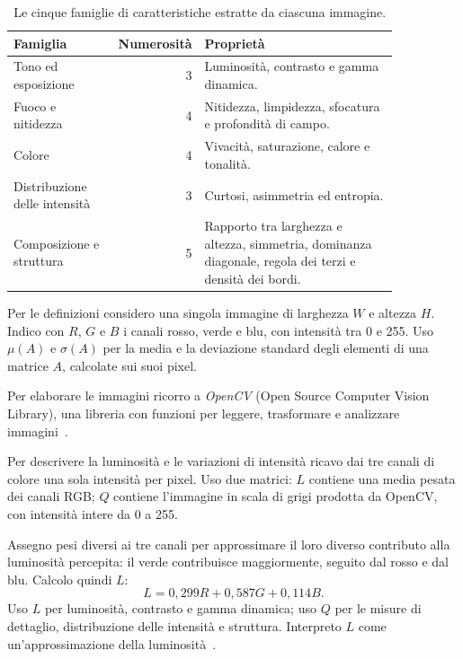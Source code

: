 \begin{table}[htbp]
    \centering
    \small
    \caption{Le cinque famiglie di caratteristiche estratte da ciascuna immagine.}
    \label{tab:feature-famiglie}
    \begin{tabular}{@{}p{0.28\linewidth}rp{0.57\linewidth}@{}}
        \toprule
        Famiglia & Numerosità & Proprietà \\
        \midrule
        Tono ed esposizione & 3 & Luminosità, contrasto e gamma dinamica. \\
        Fuoco e nitidezza & 4 & Nitidezza, limpidezza, sfocatura e profondità di campo. \\
        Colore & 4 & Vivacità, saturazione, calore e tonalità. \\
        Distribuzione delle intensità & 3 & Curtosi, asimmetria ed entropia. \\
        Composizione e struttura & 5 & Rapporto tra larghezza e altezza, simmetria, dominanza diagonale, regola dei terzi e densità dei bordi. \\
        \bottomrule
    \end{tabular}
\end{table}

Per le definizioni considero una singola immagine di larghezza $W$ e altezza $H$. Indico con $R$, $G$ e $B$ i canali rosso, verde e blu, con intensità tra 0 e 255. Uso $\mu(A)$ e $\sigma(A)$ per la media e la deviazione standard degli elementi di una matrice $A$, calcolate sui suoi pixel.

Per elaborare le immagini ricorro a \emph{OpenCV} (Open Source Computer Vision Library), una libreria con funzioni per leggere, trasformare e analizzare immagini~\cite{opencv_library}.

Per descrivere la luminosità e le variazioni di intensità ricavo dai tre canali di colore una sola intensità per pixel. Uso due matrici: $L$ contiene una media pesata dei canali RGB; $Q$ contiene l'immagine in scala di grigi prodotta da OpenCV, con intensità intere da 0 a 255.

Assegno pesi diversi ai tre canali per approssimare il loro diverso contributo alla luminosità percepita: il verde contribuisce maggiormente, seguito dal rosso e dal blu. Calcolo quindi $L$:
\begin{equation}
    L=0{,}299R+0{,}587G+0{,}114B.
    \label{eq:feature-intensita}
\end{equation}
Uso $L$ per luminosità, contrasto e gamma dinamica; uso $Q$ per le misure di dettaglio, distribuzione delle intensità e struttura. Interpreto $L$ come un'approssimazione della luminosità~\cite{itu_bt601}.

